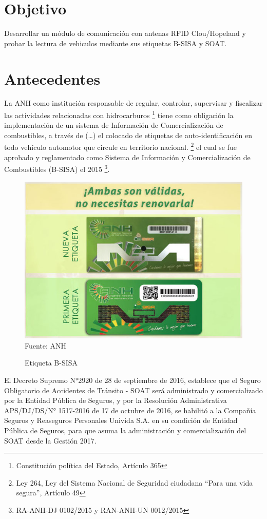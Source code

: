 \documentclass[fleqn,10pt]{SelfArx} %
\begin{document}

\section{Objetivo}

Desarrollar un módulo de comunicación con antenas RFID Clou/Hopeland y probar la lectura de vehiculos mediante sus etiquetas B-SISA y SOAT.

\section{Antecedentes}

La ANH como institución responsable de regular, controlar, supervisar y fiscalizar las actividades relacionadas con hidrocarburos \footnote{Constitución política del Estado, Artículo 365} tiene como obligación la implementación de un sistema de Información de Comercialización de combustibles, a través de (…) el colocado de etiquetas de auto-identificación en todo vehículo automotor que circule en territorio nacional. \footnote{Ley 264, Ley del Sistema Nacional de Seguridad ciudadana “Para una vida segura”, Artículo 49} el cual se fue aprobado y reglamentado como Sistema de Información y Comercialización de Combustibles (B-SISA) el 2015 \footnote{RA-ANH-DJ 0102/2015 y RAN-ANH-UN 0012/2015}.

\begin{figure}[ht]
\caption{Etiqueta B-SISA}
\centering
\includegraphics[width=0.5\linewidth]{nuevo_bsisa.jpg}
\newline Fuente: ANH
\label{fig:nuevo_bsisa}
\end{figure}

El Decreto Supremo N°2920 de 28 de septiembre de 2016, establece que el Seguro Obligatorio de Accidentes de Tránsito - SOAT será administrado y comercializado por la Entidad Pública de Seguros, y por la Resolución Administrativa  APS/DJ/DS/N° 1517-2016 de 17 de octubre de 2016, se habilitó a la Compañía Seguros y Reaseguros Personales Univida S.A. en su condición de Entidad Pública de Seguros, para que asuma la administración y comercialización del SOAT desde la Gestión 2017. 
\end{document}

